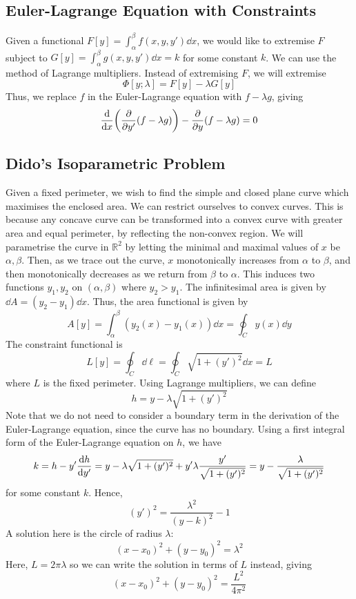 \subsection{Euler-Lagrange Equation with Constraints}
Given a functional \( F[y] = \int_\alpha^\beta f(x,y,y') \dd{x} \), we would like to extremise \( F \) subject to \( G[y] = \int_\alpha^\beta g(x,y,y') \dd{x} = k \) for some constant \( k \).
We can use the method of Lagrange multipliers.
Instead of extremising \( F \), we will extremise
\[ \Phi[y;\lambda] = F[y] - \lambda G[y] \]
Thus, we replace \( f \) in the Euler-Lagrange equation with \( f - \lambda g \), giving
\[ \dv{x}\qty(\pdv{y'}(f-\lambda g)) - \pdv{y}(f-\lambda g) = 0 \]

\subsection{Dido's Isoparametric Problem}
Given a fixed perimeter, we wish to find the simple and closed plane curve which maximises the enclosed area.
We can restrict ourselves to convex curves.
This is because any concave curve can be transformed into a convex curve with greater area and equal perimeter, by reflecting the non-convex region.
We will parametrise the curve in \( \mathbb R^2 \) by letting the minimal and maximal values of \( x \) be \( \alpha, \beta \).
Then, as we trace out the curve, \( x \) monotonically increases from \( \alpha \) to \( \beta \), and then monotonically decreases as we return from \( \beta \) to \( \alpha \).
This induces two functions \( y_1, y_2 \) on \( (\alpha, \beta) \) where \( y_2 > y_1 \).
The infinitesimal area is given by \( \dd{A} = (y_2 - y_1) \dd{x} \).
Thus, the area functional is given by
\[ A[y] = \int_\alpha^\beta (y_2(x) - y_1(x))\dd{x} = \oint_C y(x) \dd{y} \]
The constraint functional is
\[ L[y] = \oint_C \dd{\ell} = \oint_C \sqrt{1 + (y')^2} \dd{x} = L \]
where \( L \) is the fixed perimeter.
Using Lagrange multipliers, we can define
\[ h = y - \lambda \sqrt{1 + (y')^2} \]
Note that we do not need to consider a boundary term in the derivation of the Euler-Lagrange equation, since the curve has no boundary.
Using a first integral form of the Euler-Lagrange equation on \( h \), we have
\[ k = h - y'\dv{h}{y'} = y - \lambda \sqrt{1 + (y')^2} + y' \lambda \frac{y'}{\sqrt{1 + (y')^2}} = y - \frac{\lambda}{\sqrt{1 + (y')^2}} \]
for some constant \( k \). Hence,
\[ (y')^2 = \frac{\lambda^2}{(y - k)^2} - 1 \]
A solution here is the circle of radius \( \lambda \):
\[ (x - x_0)^2 + (y - y_0)^2 = \lambda^2 \]
Here, \( L = 2 \pi \lambda \) so we can write the solution in terms of \( L \) instead, giving
\[ (x - x_0)^2 + (y - y_0)^2 = \frac{L^2}{4\pi^2} \]

